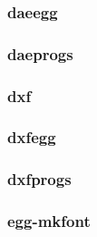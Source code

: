 \documentclass[a4paper]{article}
\begin{document}
\hypertarget{RefHeading22631167907073}{}\subsubsection{}
\clearpage\subsubsection[daeegg]{daeegg}
\hypertarget{RefHeading22651167907073}{}\subsubsection{}
\clearpage\subsubsection[daeprogs]{daeprogs}
\hypertarget{RefHeading22671167907073}{}\subsubsection{}
\clearpage\subsubsection[dxf]{dxf}
\hypertarget{RefHeading22691167907073}{}\subsubsection{}
\clearpage\subsubsection[dxfegg]{dxfegg}
\hypertarget{RefHeading22711167907073}{}\subsubsection{}
\clearpage\subsubsection[dxfprogs]{dxfprogs}
\hypertarget{RefHeading22731167907073}{}\subsubsection{}
\clearpage\subsubsection[egg{}-mkfont]{egg-mkfont}
\hypertarget{RefHeading22751167907073}{}\subsubsection{}
\end{document}
